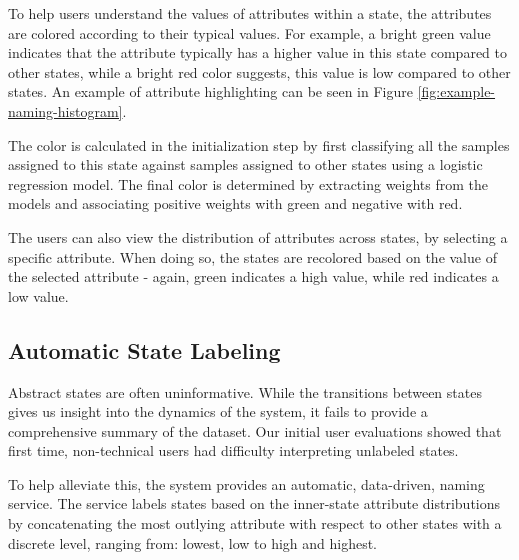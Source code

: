 %
To help users understand the  values of attributes within a state, the attributes are colored according to their typical values.  For example, a bright green
value indicates that the attribute typically  has a higher value in this state compared to other states, while
a bright red color suggests, this value is low compared to other states. An example of attribute 
highlighting can be seen in Figure \ref{fig:example-naming-histogram}.

The color is calculated in the initialization step by first classifying all the samples assigned to this state 
against samples assigned to other states using a logistic regression model. 
The final color is determined by extracting weights from the models and associating positive weights
with green and negative with red.

The users can also view the distribution of attributes across states, by selecting a specific attribute.
When doing so, the states are recolored based on the value of the selected attribute - again, green indicates
a high value, while red indicates a low value.


\subsection{Automatic State Labeling}

Abstract states are often uninformative. While the transitions between states gives us insight into the dynamics of the system, it fails to provide a comprehensive summary 
of the dataset. Our initial user evaluations showed that first time, non-technical users had difficulty interpreting unlabeled states. %

To help alleviate this, the system provides an automatic, data-driven, naming service. The service labels
states based on the inner-state attribute distributions by concatenating the most outlying attribute with respect to other states with a discrete level, ranging from: lowest, low to high and highest. 

